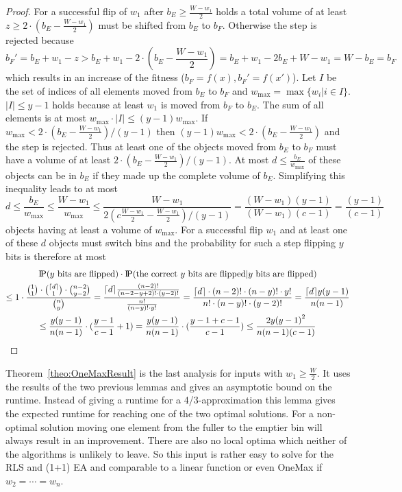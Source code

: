 \begin{proof}
    For a successful flip of $w_1$ after $b_E \ge \frac{W-w_1}{2}$ holds a total volume of at least $z\ge2\cdot(b_E-\frac{W-w_1}{2})$ must be shifted from $b_E$ to $b_F$.
    Otherwise the step is rejected because
    \[b_F'=b_E+w_1-z>b_E+w_1-2\cdot(b_E-\frac{W-w_1}{2})=b_E+w_1-2b_E+W-w_1=W-b_E=b_F\]
    which results in an increase of the fitness ($b_F = f(x), b_F' = f(x')$).
    Let $I$ be the set of indices of all elements moved from $b_E$ to $b_F$ and $w_{\max}=\max{\{w_i|i\in I\}}$.
    $|I|\le y-1$ holds because at least $w_1$ is moved from $b_F$ to $b_E$.
    The sum of all elements is at most $w_{\max} \cdot |I| \le (y-1)w_{\max}$.
    If \(w_{\max}<2\cdot(b_E-\frac{W-w_1}{2})/(y-1)\) then \((y-1)w_{\max}<2\cdot(b_E-\frac{W-w_1}{2})\) and the step is rejected.
    Thus at least one of the objects moved from $b_E$ to $b_F$ must have a volume of at least $2\cdot(b_E-\frac{W-w_1}{2})/(y-1)$.
    At most \(d\le\frac{b_E}{w_{\max}}\) of these objects can be in $b_E$ if they made up the complete volume of $b_E$. Simplifying this inequality leads to at most
    \[
        d \le \frac{b_E}{w_{\max}}
        \le \frac{W-w_1}{w_{\max}}
        \le \frac{W-w_1}{2(c\frac{W-w_1}{2}-\frac{W-w_1}{2})/(y-1)}
        = \frac{(W-w_1)(y-1)}{(W-w_1)(c-1)}
        = \frac{(y-1)}{(c-1)}
    \]
    objects having at least a volume of $w_{\max}$.
    For a successful flip $w_1$ and at least one of these $d$ objects must switch bins and the probability for such a step flipping $y$ bits is therefore at most
    \begin{gather}
        \nonumber \text{I\kern-0.15em P}(y \text{ bits are flipped})\cdot\text{I\kern-0.15em P}(\text{the correct $y$ bits are flipped} | y \text{ bits are flipped})\\ \nonumber
        \le 1\cdot \frac{\binom{1}{1}\cdot\binom{\lceil d\rceil}{1}\cdot\binom{n-2}{y-2}}{\binom{n}{y}}
        =\frac{\lceil d\rceil\frac{(n-2)!}{(n-2-y+2)!\cdot (y-2)!}}{\frac{n!}{(n-y)!\cdot y!}}
        =\frac{\lceil d\rceil\cdot(n-2)!\cdot(n-y)!\cdot y!}{n!\cdot(n-y)!\cdot(y-2)!}
        = \frac{\lceil d\rceil y{(y-1)}}{n(n-1)}\\ \nonumber
        \le \frac{y{(y-1)}}{n(n-1)}\cdot(\frac{y-1}{c-1}+1)
        = \frac{y{(y-1)}}{n(n-1)}\cdot(\frac{y-1+c-1}{c-1})
        \le \frac{2y{(y-1)}^2}{n(n-1)(c-1)}
    \end{gather}
\end{proof}

Theorem~\ref{theo:OneMaxResult} is the last analysis for inputs with $w_1 \ge \frac W 2$.
It uses the results of the two previous lemmas and gives an asymptotic bound on the runtime.
Instead of giving a runtime for a 4/3-approximation this lemma gives the expected runtime for reaching one of the two optimal solutions.
For a non-optimal solution moving one element from the fuller to the emptier bin will always result in an improvement.
There are also no local optima which neither of the algorithms is unlikely to leave.
So this input is rather easy to solve for the RLS and (1+1) EA and comparable to a linear function or even OneMax if $w_2=\cdots=w_n$.

